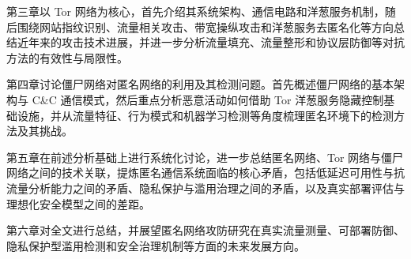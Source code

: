第三章以 Tor 网络为核心，首先介绍其系统架构、通信电路和洋葱服务机制，随后围绕网站指纹识别、流量相关攻击、带宽操纵攻击和洋葱服务去匿名化等方向总结近年来的攻击技术进展，并进一步分析流量填充、流量整形和协议层防御等对抗方法的有效性与局限性。

第四章讨论僵尸网络对匿名网络的利用及其检测问题。首先概述僵尸网络的基本架构与 C\&C 通信模式，然后重点分析恶意活动如何借助 Tor 洋葱服务隐藏控制基础设施，并从流量特征、行为模式和机器学习检测等角度梳理匿名环境下的检测方法及其挑战。

第五章在前述分析基础上进行系统化讨论，进一步总结匿名网络、Tor 网络与僵尸网络之间的技术关联，提炼匿名通信系统面临的核心矛盾，包括低延迟可用性与抗流量分析能力之间的矛盾、隐私保护与滥用治理之间的矛盾，以及真实部署评估与理想化安全模型之间的差距。

第六章对全文进行总结，并展望匿名网络攻防研究在真实流量测量、可部署防御、隐私保护型滥用检测和安全治理机制等方面的未来发展方向。